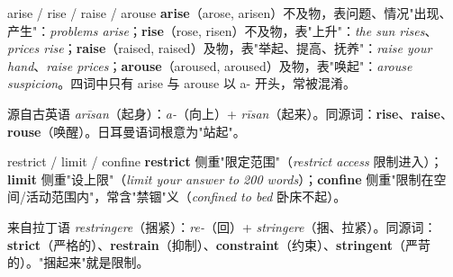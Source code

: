 \documentclass[../main.tex]{subfiles}
\begin{document}



\begin{lex}{arise / rise / raise / arouse}
\textbf{arise}（arose, arisen）不及物，表问题、情况"出现、产生"：\textit{problems arise}；\textbf{rise}（rose, risen）不及物，表"上升"：\textit{the sun rises}、\textit{prices rise}；\textbf{raise}（raised, raised）及物，表"举起、提高、抚养"：\textit{raise your hand}、\textit{raise prices}；\textbf{arouse}（aroused, aroused）及物，表"唤起"：\textit{arouse suspicion}。四词中只有 arise 与 arouse 以 a- 开头，常被混淆。
\end{lex}

\begin{origin}
源自古英语 \textit{arīsan}（起身）：\textit{a-}（向上）+ \textit{rīsan}（起来）。同源词：\textbf{rise}、\textbf{raise}、\textbf{rouse}（唤醒）。日耳曼语词根意为"站起"。
\end{origin}





\begin{lex}{restrict / limit / confine}
\textbf{restrict} 侧重"限定范围"（\textit{restrict access} 限制进入）；\textbf{limit} 侧重"设上限"（\textit{limit your answer to 200 words}）；\textbf{confine} 侧重"限制在空间/活动范围内"，常含"禁锢"义（\textit{confined to bed} 卧床不起）。
\end{lex}

\begin{origin}
来自拉丁语 \textit{restringere}（捆紧）：\textit{re-}（回）+ \textit{stringere}（捆、拉紧）。同源词：\textbf{strict}（严格的）、\textbf{restrain}（抑制）、\textbf{constraint}（约束）、\textbf{stringent}（严苛的）。"捆起来"就是限制。
\end{origin}
\end{document}
